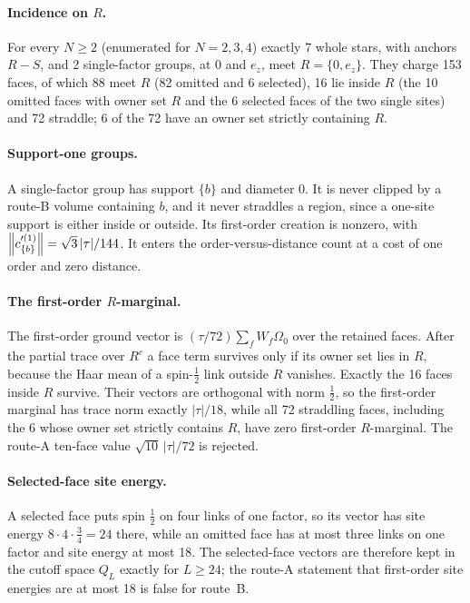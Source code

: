 \paragraph{Incidence on $R$.} For every $N\ge2$ (enumerated for $N=2,3,4$)
exactly 7 whole stars, with anchors $R-S$, and 2 single-factor groups, at 0
and $e_z$, meet $R=\{0,e_z\}$. They charge 153 faces, of which 88 meet $R$
(82 omitted and 6 selected), 16 lie inside $R$ (the 10 omitted faces with
owner set $R$ and the 6 selected faces of the two single sites) and 72
straddle; 6 of the 72 have an owner set strictly containing $R$.

\paragraph{Support-one groups.} A single-factor group has support $\{b\}$ and
diameter 0. It is never clipped by a route-B volume containing $b$, and it
never straddles a region, since a one-site support is either inside or
outside. Its first-order creation is nonzero, with
$\left\lVert c'^{(1)}_{\{b\}}\right\rVert=\sqrt3\,|\tau|/144$. It enters the order-versus-distance
count at a cost of one order and zero distance.

\paragraph{The first-order $R$-marginal.} The first-order ground vector is
$(\tau/72)\sum_fW_f\Omega_0$ over the retained faces. After the partial trace
over $R^c$ a face term survives only if its owner set lies in $R$, because
the Haar mean of a spin-$\tfrac12$ link outside $R$ vanishes. Exactly the 16
faces inside $R$ survive. Their vectors are orthogonal with norm $\tfrac12$, so
the first-order marginal has trace norm exactly $|\tau|/18$, while all 72
straddling faces, including the 6 whose owner set strictly contains $R$, have
zero first-order $R$-marginal. The route-A ten-face value
$\sqrt{10}\,|\tau|/72$ is rejected.

\paragraph{Selected-face site energy.} A selected face puts spin $\tfrac12$ on
four links of one factor, so its vector has site energy
$8\cdot4\cdot\tfrac34=24$ there, while an omitted face has at most three links
on one factor and site energy at most 18. The selected-face vectors are
therefore kept in the cutoff space $Q_L$ exactly for $L\ge24$; the route-A
statement that first-order site energies are at most 18 is false for
route~B.

